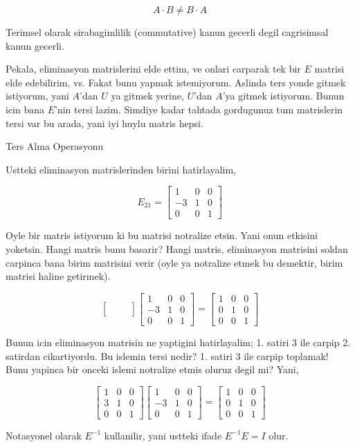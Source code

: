 \documentclass[12pt,fleqn]{article}\usepackage{../common}
\begin{document}
$$ A \cdot B \ne B \cdot A $$

Terimsel olarak sirabagimlilik (commutative) kanun gecerli degil
cagrisimsal kanun gecerli.

Pekala, eliminasyon matrislerini elde ettim, ve onlari carparak tek bir $E$
matrisi elde edebilirim, vs. Fakat bunu yapmak istemiyorum. Aslinda ters
yonde gitmek istiyorum, yani $A$'dan $U$ ya gitmek yerine, $U$'dan $A$'ya
gitmek istiyorum. Bunun icin bana $E$'nin tersi lazim. Simdiye kadar
tahtada gordugunuz tum matrislerin tersi var bu arada, yani iyi huylu
matris hepsi.

Ters Alma Operasyonu

Ustteki eliminasyon matrislerinden birini hatirlayalim, 

$$ E_{21} = \left[\begin{array}{rrr}
1 & 0 & 0 \\
-3 & 1 & 0 \\
0 & 0 & 1
\end{array}\right] $$

Oyle bir matris istiyorum ki bu matrisi notralize etsin. Yani onun etkisini
yoketsin. Hangi matris bunu basarir? Hangi matris, eliminasyon matrisini
soldan carpinca bana birim matrisini verir (oyle ya notralize etmek bu
demektir, birim matrisi haline getirmek). 

$$ 
 \left[\begin{array}{rrr}
 &  &  \\
 &  &  \\
 &  & 
\end{array}\right] 
 \left[\begin{array}{rrr}
1 & 0 & 0 \\
-3 & 1 & 0 \\
0 & 0 & 1
\end{array}\right] 
=
 \left[\begin{array}{rrr}
1 & 0 & 0 \\
0 & 1 & 0 \\
0 & 0 & 1
\end{array}\right] 
$$

Bunun icin eliminasyon matrisin ne yaptigini hatirlayalim; 1. satiri 3 ile
carpip 2. satirdan cikartiyordu. Bu islemin tersi nedir? 1. satiri 3 ile
carpip toplamak! Bunu yapinca bir onceki islemi notralize etmis oluruz
degil mi? Yani,

$$ 
 \left[\begin{array}{rrr}
1 & 0 & 0 \\
3 & 1 & 0 \\
0 & 0 & 1
\end{array}\right] 
 \left[\begin{array}{rrr}
1 & 0 & 0 \\
-3 & 1 & 0 \\
0 & 0 & 1
\end{array}\right] 
=
 \left[\begin{array}{rrr}
1 & 0 & 0 \\
0 & 1 & 0 \\
0 & 0 & 1
\end{array}\right] 
$$

Notasyonel olarak $E^{-1}$ kullanilir, yani ustteki ifade $E^{-1}E = I$ olur.
\end{document}
